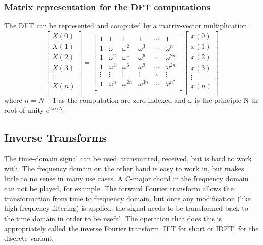 \subsubsection{Matrix representation for the DFT computations} 
The DFT can be represented and computed by a matrix-vector multiplication. 
$$
\begin{bmatrix}
    X(0) \\
    X(1) \\
    X(2) \\
    X(3) \\
    \vdots\\
    X(n) \\
\end{bmatrix}
=
\begin{bmatrix}
    1 & 1 & 1 & 1 & \cdots & 1\\
    1 & \omega & \omega ^2 & \omega ^3 & \cdots & \omega ^n\\
    1 & \omega ^2 & \omega ^4 & \omega ^6 & \cdots & \omega ^{2n}\\
    1 & \omega ^3 & \omega ^6 & \omega ^9 & \cdots & \omega ^{2n}\\
    \vdots & \vdots & \vdots & \vdots & \ddots & \vdots \\
    1 & \omega ^{n} & \omega ^{2n} & \omega ^{3n} & \cdots & \omega ^{{n^2}}\\
\end{bmatrix}
\begin{bmatrix}
    x(0) \\
    x(1) \\
    x(2) \\
    x(3) \\
    \vdots\\
    x(n) \\
\end{bmatrix}
$$
where $n = N-1$ as the computation are zero-indexed and $\omega$ is the principle N-th root of unity $e^{2\pi i/N} $. 


\subsection{Inverse Transforms}
The time-domain signal can be used, transmitted, received, but is hard to work with. The frequency domain on the other hand is easy to work in, but makes little to no sense in many use cases. A C-major chord in the frequency domain can not be played, for example. The forward Fourier transform allows the transformation from time to frequency domain, but once any modification (like high frequency filtering) is applied, the signal needs to be transformed back to the time domain in order to be useful. The operation that does this is appropriately called the inverse Fourier transform, IFT for short or IDFT, for the discrete variant.

